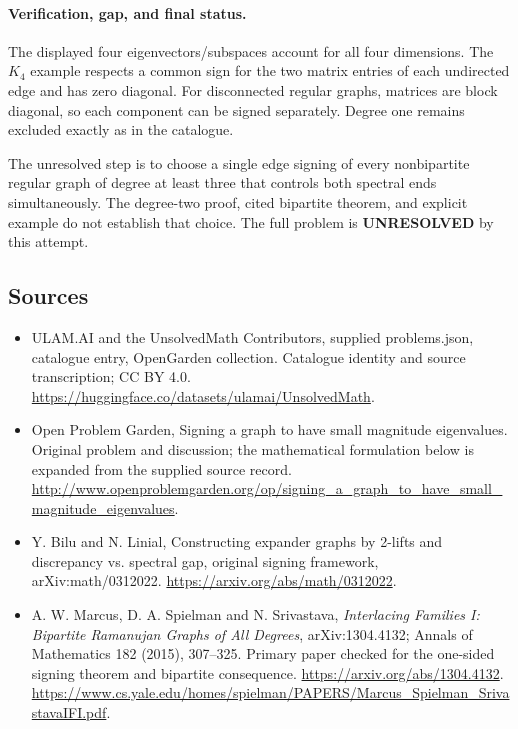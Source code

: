 \documentclass[11pt,a4paper]{article}
\begin{document}
\paragraph{Verification, gap, and final status.}
The displayed four eigenvectors/subspaces account for all four dimensions. The $K_4$ example respects a common sign for the two matrix entries of each undirected edge and has zero diagonal. For disconnected regular graphs, matrices are block diagonal, so each component can be signed separately. Degree one remains excluded exactly as in the catalogue.

The unresolved step is to choose a single edge signing of every nonbipartite regular graph of degree at least three that controls both spectral ends simultaneously. The degree-two proof, cited bipartite theorem, and explicit example do not establish that choice. The full problem is \textbf{UNRESOLVED} by this attempt.

\subsection{Sources}
\begin{itemize}
\item[S1] ULAM.AI and the UnsolvedMath Contributors, supplied problems.json, catalogue entry, OpenGarden collection. Catalogue identity and source transcription; CC BY 4.0.
\url{https://huggingface.co/datasets/ulamai/UnsolvedMath}.
\item[S2] Open Problem Garden, Signing a graph to have small magnitude eigenvalues. Original problem and discussion; the mathematical formulation below is expanded from the supplied source record.
\url{http://www.openproblemgarden.org/op/signing_a_graph_to_have_small_magnitude_eigenvalues}.
\item[S3] Y. Bilu and N. Linial, Constructing expander graphs by 2-lifts and discrepancy vs. spectral gap, original signing framework, arXiv:math/0312022.
\url{https://arxiv.org/abs/math/0312022}.
\item[R1] A. W. Marcus, D. A. Spielman and N. Srivastava, \emph{Interlacing Families I: Bipartite Ramanujan Graphs of All Degrees}, arXiv:1304.4132; Annals of Mathematics 182 (2015), 307--325. Primary paper checked for the one-sided signing theorem and bipartite consequence.
\url{https://arxiv.org/abs/1304.4132}.
\url{https://www.cs.yale.edu/homes/spielman/PAPERS/Marcus_Spielman_SrivastavaIFI.pdf}.
\end{itemize}
\end{document}
